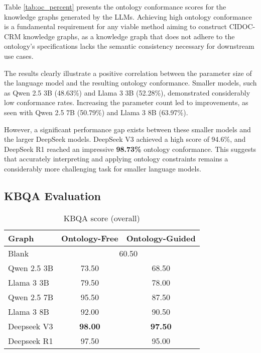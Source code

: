 \documentclass[a4, conference]{IEEEtran}
\begin{document}
Table \ref{tab:oc_percent} presents the ontology conformance scores for the knowledge graphs generated by the LLMs. Achieving high ontology conformance is a fundamental requirement for any viable method aiming to construct CIDOC-CRM knowledge graphs, as a knowledge graph that does not adhere to the ontology's specifications lacks the semantic consistency necessary for downstream use cases.

The results clearly illustrate a positive correlation between the parameter size of the language model and the resulting ontology conformance. Smaller models, such as Qwen 2.5 3B (48.63\%) and Llama 3 3B (52.28\%), demonstrated considerably low conformance rates. Increasing the parameter count led to improvements, as seen with Qwen 2.5 7B (50.79\%) and Llama 3 8B (63.97\%).

However, a significant performance gap exists between these smaller models and the larger DeepSeek models. DeepSeek V3 achieved a high score of 94.6\%, and DeepSeek R1 reached an impressive \textbf{98.73\%} ontology conformance. This suggests that accurately interpreting and applying ontology constraints remains a considerably more challenging task for smaller language models.

\subsection{KBQA Evaluation}

\begin{table}[h]
    \centering
    \caption{KBQA score (overall)}
    \label{tab:qa_percent}
    \begin{tabular}{|l|c|c|}
        \hline
        Graph       & Ontology-Free               & Ontology-Guided \\
        \hline
        Blank       & \multicolumn{2}{|c|}{60.50}                   \\
        \hline
        Qwen 2.5 3B & 73.50                       & 68.50           \\
        \hline
        Llama 3 3B  & 79.50                       & 78.00           \\
        \hline
        Qwen 2.5 7B & 95.50                       & 87.50           \\
        \hline
        Llama 3 8B  & 92.00                       & 90.50           \\
        \hline
        Deepseek V3 & \textbf{98.00}              & \textbf{97.50}  \\
        \hline
        Deepseek R1 & 97.50                       & 95.00           \\
        \hline
    \end{tabular}
\end{table}
\end{document}
